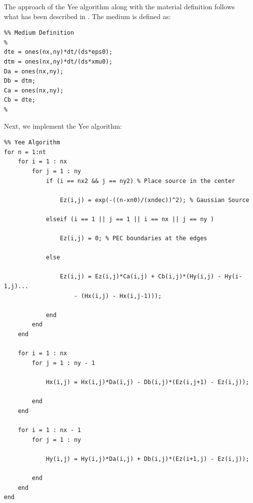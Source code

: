 \documentclass[11pt]{article}
\begin{document}
The approach of the Yee algorithm along with the material definition follows what has been described in \cite[pg. 85]{taflove_computational_2005}. The medium is defined as:

\begin{mdframed}[backgroundcolor=gray!20]
  \scriptsize
  \begin{verbatim}
%% Medium Definition
%
dte = ones(nx,ny)*dt/(ds*eps0);
dtm = ones(nx,ny)*dt/(ds*xmu0);
Da = ones(nx,ny);
Db = dtm;
Ca = ones(nx,ny);
Cb = dte;
%
  \end{verbatim}
\end{mdframed}

Next, we implement the Yee algorithm:

\begin{mdframed}[backgroundcolor=gray!20]
  \scriptsize
  \begin{verbatim}
%% Yee Algorithm
for n = 1:nt
    for i = 1 : nx
        for j = 1 : ny
            if (i == nx2 && j == ny2) % Place source in the center
                
                Ez(i,j) = exp(-((n-xn0)/(xndec))^2); % Gaussian Source
                
            elseif (i == 1 || j == 1 || i == nx || j == ny )
                
                Ez(i,j) = 0; % PEC boundaries at the edges
                
            else
                
                Ez(i,j) = Ez(i,j)*Ca(i,j) + Cb(i,j)*(Hy(i,j) - Hy(i-1,j)...
                    - (Hx(i,j) - Hx(i,j-1)));
                
            end
        end
    end
    
    for i = 1 : nx
        for j = 1 : ny - 1
            
            Hx(i,j) = Hx(i,j)*Da(i,j) - Db(i,j)*(Ez(i,j+1) - Ez(i,j));
            
        end
    end
    
    for i = 1 : nx - 1
        for j = 1 : ny
            
            Hy(i,j) = Hy(i,j)*Da(i,j) + Db(i,j)*(Ez(i+1,j) - Ez(i,j));
            
        end
    end
end
  \end{verbatim}
\end{mdframed}
\end{document}
